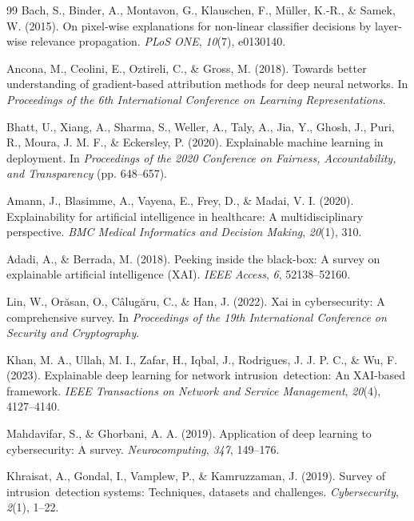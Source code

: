 \documentclass[sensors,apajournal,article,submit,moreauthors]{Definitions/mdpi}
\begin{document}
\begin{thebibliography}{99}
Bach, S., Binder, A., Montavon, G., Klauschen, F., M\"uller, K.-R., \& Samek, W. (2015). On pixel-wise explanations for non-linear classifier decisions by layer-wise relevance propagation. \textit{PLoS ONE}, \textit{10}(7), e0130140.

Ancona, M., Ceolini, E., Oztireli, C., \& Gross, M. (2018). Towards better understanding of gradient-based attribution methods for deep neural networks. In \textit{Proceedings of the 6th International Conference on Learning Representations}.

Bhatt, U., Xiang, A., Sharma, S., Weller, A., Taly, A., Jia, Y., Ghosh, J., Puri, R., Moura, J. M. F., \& Eckersley, P. (2020). Explainable machine learning in deployment. In \textit{Proceedings of the 2020 Conference on Fairness, Accountability, and Transparency} (pp. 648--657).

Amann, J., Blasimme, A., Vayena, E., Frey, D., \& Madai, V. I. (2020). Explainability for artificial intelligence in healthcare: A multidisciplinary perspective. \textit{BMC Medical Informatics and Decision Making}, \textit{20}(1), 310.

Adadi, A., \& Berrada, M. (2018). Peeking inside the black-box: A survey on explainable artificial intelligence (XAI). \textit{IEEE Access}, \textit{6}, 52138--52160.

Lin, W., Orăsan, O., C\^{a}lug\u{a}ru, C., \& Han, J. (2022). Xai in cybersecurity: A comprehensive survey. In \textit{Proceedings of the 19th International Conference on Security and Cryptography}.

Khan, M. A., Ullah, M. I., Zafar, H., Iqbal, J., Rodrigues, J. J. P. C., \& Wu, F. (2023). Explainable deep learning for network \mbox{intrusion detection}: An XAI-based framework. \textit{IEEE Transactions on Network and Service Management}, \textit{20}(4), 4127--4140.

Mahdavifar, S., \& Ghorbani, A. A. (2019). Application of deep learning to cybersecurity: A survey. \textit{Neurocomputing}, \textit{347}, 149--176.

Khraisat, A., Gondal, I., Vamplew, P., \& Kamruzzaman, J. (2019). Survey of \mbox{intrusion detection} systems: Techniques, datasets and challenges. \textit{Cybersecurity}, \textit{2}(1), 1--22.


\end{thebibliography}
\end{document}
